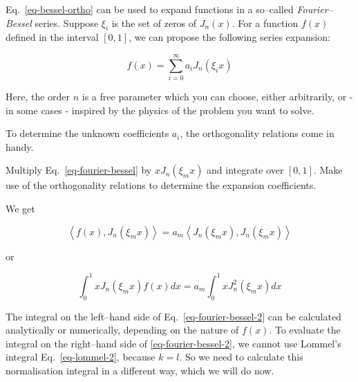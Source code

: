 \noindent{}Eq.~\ref{eq-bessel-ortho} can be used to expand functions in a so--called \emph{Fourier--Bessel} series. Suppose $\xi_i$ is the set of zeros of $J_n(x)$. For a function $f(x)$ defined in the interval $[0,1]$, we can propose the following series expansion:

\begin{equation}
f(x) = \sum_{i=0}^{\infty} a_i J_n(\xi_i x) \label{eq-fourier-bessel}
\end{equation} 

Here, the order $n$ is a free parameter which you can choose, either arbitrarily, or - in some cases - inspired by the physics of the problem you want to solve.

To determine the unknown coefficients $a_i$, the orthogonality relations come in handy.

\begin{cue}
Multiply Eq.~\ref{eq-fourier-bessel} by $x J_n(\xi_m x)$ and integrate over $[0,1]$. Make use of the orthogonality relations to determine the expansion coefficients.  
\end{cue}

We get

\begin{equation}
  \left<f(x),J_n(\xi_m x)\right> = a_m \left<J_n(\xi_m x),J_n(\xi_m x)\right>
\end{equation} 

or

\begin{equation}
\int_0^1 x J_n(\xi_m x) f(x) dx = a_m \int_0^1 x J_n^2(\xi_m x) dx \label{eq-fourier-bessel-2}
\end{equation} 

The integral on the left--hand side of Eq.~\ref{eq-fourier-bessel-2} can be calculated analytically or numerically, depending on the nature of $f(x)$. To evaluate the integral on the right--hand side of \ref{eq-fourier-bessel-2}, we cannot use Lommel's integral Eq.~\ref{eq-lommel-2}, because $k=l$. So we need to calculate this normalisation integral  in a different way, which we will do now.

\pagebreak


